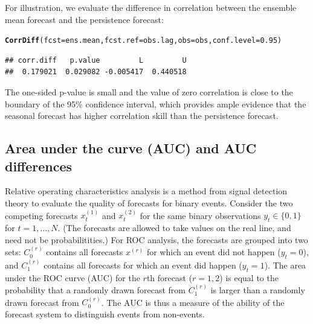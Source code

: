 \documentclass[article]{jss}\usepackage{graphicx, color}
\makeatletter
\newcommand{\hlfunctioncall}[1]{\textcolor[rgb]{0,0.501960784313725,0.752941176470588}{\textbf{#1}}}%
\newenvironment{kframe}{%
 \def\at@end@of@kframe{}%
 \ifinner\ifhmode%
  \def\at@end@of@kframe{\end{minipage}}%
  \begin{minipage}{\columnwidth}%
 \fi\fi%
 \def\FrameCommand##1{\hskip\@totalleftmargin \hskip-\fboxsep
 \colorbox{shadecolor}{##1}\hskip-\fboxsep
     \hskip-\linewidth \hskip-\@totalleftmargin \hskip\columnwidth}%
 \MakeFramed {\advance\hsize-\width
   \@totalleftmargin\z@ \linewidth\hsize
   \@setminipage}}%
 {\par\unskip\endMakeFramed%
 \at@end@of@kframe}
\newenvironment{knitrout}{}{} %
\makeatother
\begin{document}
For illustration, we evaluate the difference in correlation between the ensemble mean forecast and the persistence forecast:
%
\begin{knitrout}
\color{fgcolor}\begin{kframe}
\begin{alltt}
\hlfunctioncall{CorrDiff}(fcst=ens.mean, fcst.ref=obs.lag, obs=obs, conf.level=0.95)
\end{alltt}
\begin{verbatim}
## corr.diff   p.value         L         U 
##  0.179021  0.029082 -0.005417  0.440518
\end{verbatim}
\end{kframe}
\end{knitrout}

%
The one-sided p-value is small and the value of zero correlation is close to the boundary of the 95\% confidence interval, which provides ample evidence that the seasonal forecast has higher correlation skill than the persistence forecast.


\subsection{Area under the curve (AUC) and AUC differences}

Relative operating characteristics \citep[ROC, ][and references therein]{mason2002areas} analysis is a method from signal detection theory to evaluate the quality of forecasts for binary events.
Consider the two competing forecasts $x^{(1)}_t$ and $x^{(2)}_t$ for the same binary observations $y_t \in \{0, 1\}$ for $t=1,\dots,N$.
(The forecasts are allowed to take values on the real line, and need not be probabilitities.)
For ROC analysis, the forecasts are grouped into two sets: $C^{(r)}_0$ contains all forecasts $x^{(r)}$ for which an event did not happen ($y_t=0$), and $C^{(r)}_1$ contains all forecasts for which an event did happen ($y_t = 1$).
The area under the ROC curve (AUC) for the $r$th forecast ($r=1,2$) is equal to the probability that a randomly drawn forecast from $C^{(r)}_1$ is larger than a randomly drawn forecast from $C^{(r)}_0$.
The AUC is thus a measure of the ability of the forecast system to distinguish events from non-events.
\end{document}
